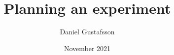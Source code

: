 \documentclass[11pt, a4paper]{article}
\title{Planning an experiment}
\author{Daniel Gustafsson}
\date{November 2021}
\begin{document}
\maketitle

\section{}



\end{document}
